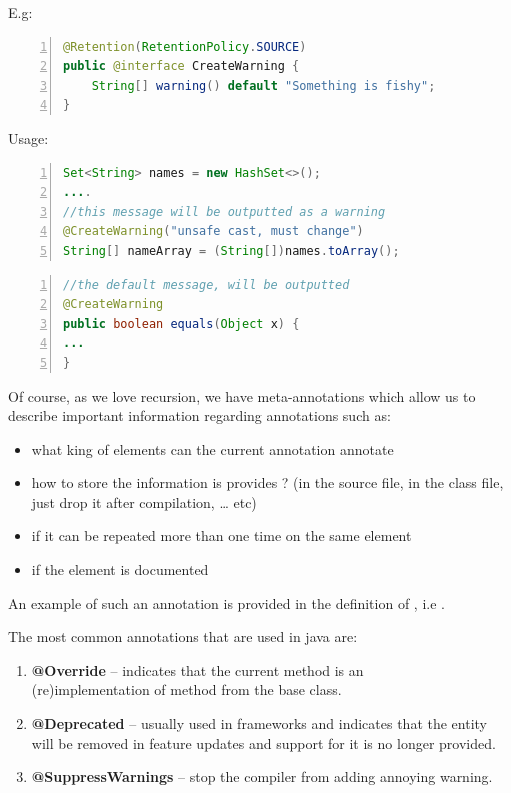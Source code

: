 	E.g:
	\small
	\begin{lstlisting}[language=Java,numbers=left]
	@Retention(RetentionPolicy.SOURCE)
public @interface CreateWarning {
	String[] warning() default "Something is fishy"; 
}
	\end{lstlisting}
	\normalsize{}
	
	Usage:
	
	
	\small
	\begin{lstlisting}[language=Java,numbers=left]
Set<String> names = new HashSet<>();
....
//this message will be outputted as a warning
@CreateWarning("unsafe cast, must change")
String[] nameArray = (String[])names.toArray();
	\end{lstlisting}
	\normalsize{}
	
	\small
	\begin{lstlisting}[language=Java,numbers=left]
//the default message, will be outputted
@CreateWarning
public boolean equals(Object x) {
...
}
	\end{lstlisting}
	\normalsize{}
	
	Of course, as we love recursion, we have meta-annotations which
allow us to describe important information regarding annotations such as:
	\begin{itemize}
	 	\item what king of elements can the current annotation annotate
	 	\item how to store the information is provides ? (in the source file, in the
class file, just drop it after compilation, \ldots{} etc)
	 	\item if it can be repeated more than one time on the same element
	 	\item if the element is  documented
	\end{itemize}
	An example of such an annotation is provided in the definition of
, i.e .
	
	The most common annotations that are used in java are:
	\begin{enumerate}
	  \item \textbf{@Override} -- indicates that the current method is an \\
 (re)implementation of method from the base class.
  
	  \item \textbf{@Deprecated} -- usually used in frameworks and indicates that
	  the entity will be removed in feature updates and support for it is no longer
 provided.
 
	  \item \textbf{@SuppressWarnings} -- stop the compiler from adding annoying
 warning.
	\end{enumerate}	

